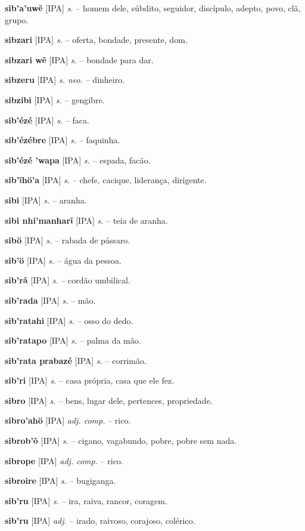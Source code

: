 {\textbf{sib'a'uwẽ} [IPA] \textit{s.} -- homem dele, súbdito, seguidor, discípulo, adepto, povo, clã, grupo.

\textbf{sibzari} [IPA] \textit{s.} -- oferta, bondade, presente, dom.

\textbf{sibzari wẽ} [IPA] \textit{s.} -- bondade para dar.

\textbf{sibzeru} [IPA] \textit{s. neo.} -- dinheiro.

\textbf{sibzibi} [IPA] \textit{s.} -- gengibre.

\textbf{sib'ézé} [IPA] \textit{s.} -- faca.

\textbf{sib'ézébre} [IPA] \textit{s.} -- faquinha.

\textbf{sib'ézé 'wapa} [IPA] \textit{s.} -- espada, facão.

\textbf{sib'ĩhö'a} [IPA] \textit{s.} -- chefe, cacique, liderança, dirigente.

\textbf{sibi} [IPA] \textit{s.} -- aranha.

\textbf{sibi nhi'manharĩ} [IPA] \textit{s.} -- teia de aranha.

\textbf{sibö} [IPA] \textit{s.} -- rabada de pássaro.

\textbf{sib'ö} [IPA] \textit{s.} -- água da pessoa.

\textbf{sib'rã} [IPA] \textit{s.} -- cordão umbilical.

\textbf{sib'rada} [IPA] \textit{s.} -- mão.

\textbf{sib'ratahi} [IPA] \textit{s.} -- osso do dedo.

\textbf{sib'ratapo} [IPA] \textit{s.} -- palma da mão.

\textbf{sib'rata prabazé} [IPA] \textit{s.} -- corrimão.

\textbf{sib'ri} [IPA] \textit{s.} -- casa própria, casa que ele fez.

\textbf{sibro} [IPA] \textit{s.} -- bens, lugar dele, pertences, propriedade.

\textbf{sibro'ahö} [IPA] \textit{adj. comp.} -- rico.

\textbf{sibrob'õ} [IPA] \textit{s.} -- cigano, vagabundo, pobre, pobre sem nada.

\textbf{sibrope} [IPA] \textit{adj. comp.} -- rico.

\textbf{sibroire} [IPA] \textit{s.} -- bugiganga.

\textbf{sib'ru} [IPA] \textit{s.} -- ira, raiva, rancor, coragem.

\textbf{sib'ru} [IPA] \textit{adj.} -- irado, raivoso, corajoso, colérico.

}
